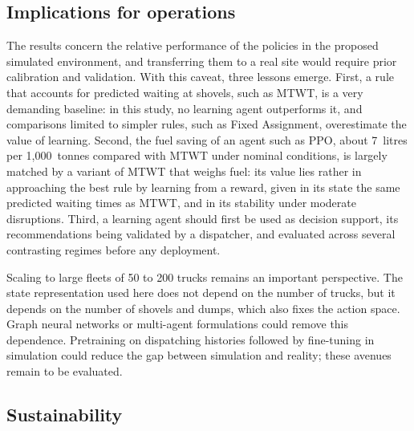 \documentclass[11pt,a4paper]{article}
\newif\ifrevmarks
\newcommand{\revtag}[1]{\ifrevmarks\textsuperscript{\textcolor{red!70!black}{\scriptsize[#1]}}\fi}
\newenvironment{revbloc}[1]{\par\ifrevmarks\color{revcolor}\noindent\revtag{#1}\ \fi}{\par}
\newif\ifcorrmarks
\newcommand{\corr}[1]{\ifcorrmarks\textcolor{corrcolor}{#1}\else#1\fi}
\begin{document}
\subsection{Implications for operations}

\begin{revbloc}{T31}
The results concern the relative performance of the policies in the proposed simulated environment, and transferring them to a real site would require prior calibration and validation. With this caveat, three lessons emerge. First, a rule that accounts for predicted waiting at shovels, such as MTWT, is a very demanding baseline: in this study, no learning agent outperforms it, and comparisons limited to simpler rules, such as Fixed Assignment, overestimate the value of learning. \corr{Second, the fuel saving of an agent such as PPO, about 7~litres per 1,000~tonnes compared with MTWT under nominal conditions, is largely matched by a variant of MTWT that weighs fuel: its value lies rather in approaching the best rule by learning from a reward, given in its state the same predicted waiting times as MTWT, and in its stability under moderate disruptions.} Third, a learning agent should first be used as decision support, its recommendations being validated by a dispatcher, and evaluated across several contrasting regimes before any deployment.

Scaling to large fleets of 50 to 200 trucks remains an important perspective. The state representation used here does not depend on the number of trucks, but it depends on the number of shovels and dumps, which also fixes the action space. Graph neural networks or multi-agent formulations \cite{Zhao2025} could remove this dependence. Pretraining on dispatching histories followed by fine-tuning in simulation could reduce the gap between simulation and reality; these avenues remain to be evaluated.
\end{revbloc}

\subsection{Sustainability}
\label{sec:sustainability}
\end{document}

